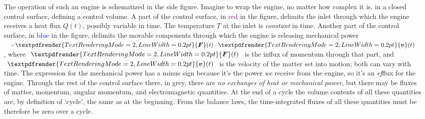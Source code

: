 \documentclass[a4paper,12pt,%
onecolumn,oneside,%
british%
]{memoir}
\renewcommand*{\bm}[1]{\textpdfrender{TextRenderingMode=2,LineWidth=0.2pt}{\boldsymbol{#1}}}
\renewcommand*{\|}[1][]{\nonscript\:#1\vert\nonscript\:\mathopen{}}
\newcommand*{\yv}{\bm{v}}
\newcommand*{\yQ}{Q}%
\newcommand*{\yF}{\bm{F}}
\newcommand*{\yT}{T}%
\begin{document}
The operation of such an engine is schematized in the side figure. Imagine to wrap the engine, no matter how complex it is, in a closed control surface, defining a control volume. A part of the control surface, in \textcolor{purple}{red} in the figure, delimits the inlet through which the engine receives a heat flux $\yQ(t)$, possibly variable in time. The temperature $\yT$ at the inlet is \emph{constant} in time. Another part of the control surface, in \textcolor{blue}{blue} in the figure, delimits the movable components through which the engine is releasing mechanical power $-\yF(t)\cdot\yv(t)$, where $\yF(t)$ is the influx of momentum through that part, and $\yv(t)$ is the velocity of the matter set into motion; both can vary with time. The expression for the mechanical power has a minus sign because it's the power \emph{we} receive from the engine, so it's an \emph{ef}flux for the engine. Through the rest of the control surface there, in \textcolor{midgrey}{grey}, there are \emph{no exchanges of heat or mechanical power}, but there may be fluxes of matter, momentum, angular momentum, and electromagnetic quantities. At the end of a cycle the volume contents of all these quantities are, by definition of \enquote*{cycle}, the same as at the beginning. From the balance laws, the time-integrated fluxes of all these quantities must be therefore be zero over a cycle.
%
%
\end{document}
